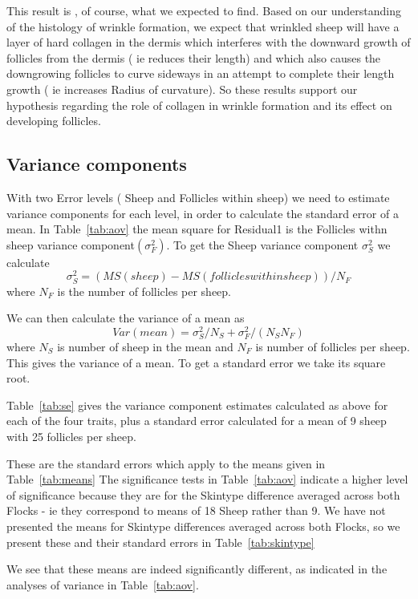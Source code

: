 \documentclass[titlepage]{article}  %
\begin{document}
This result is , of course, what we expected to find.  Based on our understanding of the histology of wrinkle formation, we expect that wrinkled sheep will have a layer of hard collagen in the dermis which interferes with the downward growth of follicles from the dermis ( ie reduces their length) and which also causes the downgrowing follicles to curve sideways in an attempt to complete their length growth ( ie increases Radius of curvature).  So these results support our hypothesis regarding the role of collagen in wrinkle formation and its effect on developing follicles.

\subsection{Variance components}
With two Error levels ( Sheep and Follicles within sheep) we need to estimate variance components for each level, in order to calculate the standard error of a mean.  In Table~\ref{tab:aov} the mean square for Residual1 is the Follicles withn sheep variance component$(\sigma^{2}_{F})$. To get the Sheep variance component $\sigma^{2}_{S}$ we calculate
\begin{displaymath}
\sigma^{2}_{S} = (MS(sheep) - MS(follicles within sheep)) / N_{F}
\end{displaymath}
where $N_{F}$ is the number of follicles per sheep.

We can then calculate the variance of a mean as
\begin{displaymath}
Var(mean) = \sigma^{2}_{S}/N_{S} + \sigma^{2}_{F}/(N_{S} N_{F})
\end{displaymath}
where $N_{S}$ is number of sheep in the mean and $N_{F}$ is number of follicles per sheep.
This gives the variance of a mean. To get a standard error we take its square root.

Table~\ref{tab:se} gives the variance component estimates calculated as above  for each of the four traits, plus a standard error calculated for a mean of 9 sheep with 25 follicles per sheep.

These are the standard errors which apply to the means given in Table~\ref{tab:means} The significance tests in Table~\ref{tab:aov} indicate a higher level of significance because they are for the Skintype difference averaged across both Flocks - ie they correspond to means of 18 Sheep rather than 9. We have not presented the means for Skintype differences averaged across both Flocks, so we present these and their standard errors in Table~\ref{tab:skintype}

We see that these means are indeed significantly different, as indicated in the analyses of variance in Table~\ref{tab:aov}.
\end{document}
